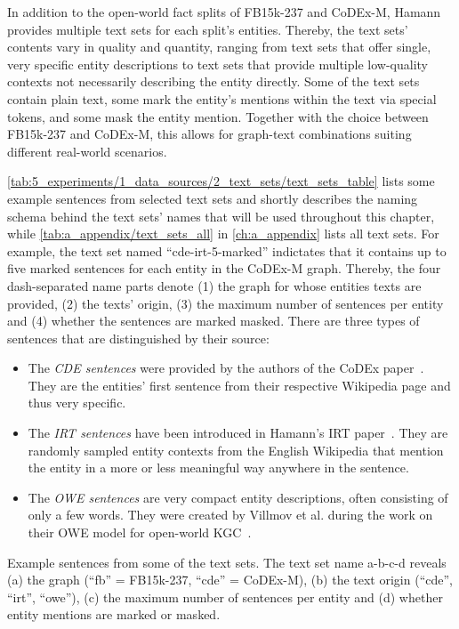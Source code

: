 In addition to the open-world fact splits of FB15k-237 and CoDEx-M, Hamann provides multiple text sets for each split's entities. Thereby, the text sets' contents vary in quality and quantity, ranging from text sets that offer single, very specific entity descriptions to text sets that provide multiple low-quality contexts not necessarily describing the entity directly. Some of the text sets contain plain text, some mark the entity's mentions within the text via special tokens, and some mask the entity mention. Together with the choice between FB15k-237 and CoDEx-M, this allows for graph-text combinations suiting different real-world scenarios.

\autoref{tab:5_experiments/1_data_sources/2_text_sets/text_sets_table} lists some example sentences from selected text sets and shortly describes the naming schema behind the text sets' names that will be used throughout this chapter, while \autoref{tab:a_appendix/text_sets_all} in \autoref{ch:a_appendix} lists all text sets. For example, the text set named ``cde-irt-5-marked'' indictates that it contains up to five marked sentences for each entity in the CoDEx-M graph. Thereby, the four dash-separated name parts denote (1) the graph for whose entities texts are provided, (2) the texts' origin, (3) the maximum number of sentences per entity and (4) whether the sentences are marked masked. There are three types of sentences that are distinguished by their source:

\begin{itemize}
    \item The \emph{CDE sentences} were provided by the authors of the CoDEx paper~\cite{}. They are the entities' first sentence from their respective Wikipedia page and thus very specific.
    \item The \emph{IRT sentences} have been introduced in Hamann's IRT paper~\cite{}. They are randomly sampled entity contexts from the English Wikipedia that mention the entity in a more or less meaningful way anywhere in the sentence.
    \item The \emph{OWE sentences} are very compact entity descriptions, often consisting of only a few words. They were created by Villmov et al. during the work on their OWE model for open-world KGC~\cite{Shah2019AnOE}.
\end{itemize}

\begin{table}
    \centering
    
    \caption{Example sentences from some of the text sets. The text set name a-b-c-d reveals (a) the graph (``fb'' = FB15k-237, ``cde'' = CoDEx-M), (b) the text origin (``cde'', ``irt'', ``owe''), (c) the maximum number of sentences per entity and (d) whether entity mentions are marked or masked.}
    \label{tab:5_experiments/1_data_sources/2_text_sets/text_sets_table}
\end{table}

